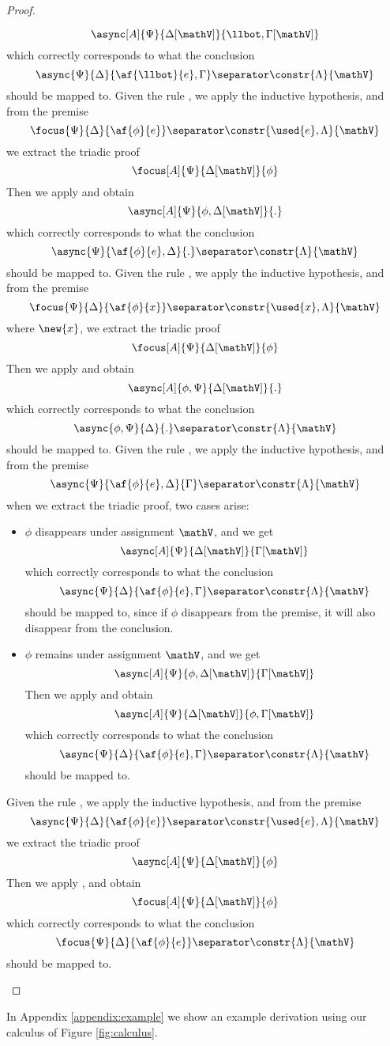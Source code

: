 \begin{proof}
\begin{itemize}
			$$ \async[A]{\Psi}{\Delta[\mathV]}{\llbot, \Gamma[\mathV]} $$
			which correctly corresponds to what the conclusion
			$$ \async{\Psi}{\Delta}{\af{\llbot}{e}, \Gamma} \separator \constr{\Lambda}{\mathV} $$
			should be mapped to.
		\indCase{\displaydecide[1]} Given the rule \derRule{\displaydecide[1]}, we apply the inductive hypothesis, and from the premise
			$$ \focus{\Psi}{\Delta}{\af{\phi}{e}} \separator \constr{\used{e}, \Lambda}{\mathV} $$
			we extract the triadic proof
			$$ \focus[A]{\Psi}{\Delta[\mathV]}{\phi} $$
			Then we apply \derRule[A]{\displaydecide[1]} and obtain
			$$ \async[A]{\Psi}{\phi, \Delta[\mathV]}{.} $$
			which correctly corresponds to what the conclusion
			$$ \async{\Psi}{\af{\phi}{e}, \Delta}{.} \separator \constr{\Lambda}{\mathV} $$
			should be mapped to.
		\indCase{\displaydecide[2]} Given the rule \derRule{\displaydecide[2]}, we apply the inductive hypothesis, and from the premise
			$$ \focus{\Psi}{\Delta}{\af{\phi}{x}} \separator \constr{\used{x}, \Lambda}{\mathV} $$
			where $\new{x}$, we extract the triadic proof
			$$ \focus[A]{\Psi}{\Delta[\mathV]}{\phi} $$
			Then we apply \derRule[A]{\displaydecide[2]} and obtain
			$$ \async[A]{\phi, \Psi}{ \Delta[\mathV]}{.} $$
			which correctly corresponds to what the conclusion
			$$ \async{\phi, \Psi}{\Delta}{.} \separator \constr{\Lambda}{\mathV} $$
			should be mapped to.
		\indCase{\displaytodelta} Given the rule \derRule{\displaytodelta}, we apply the inductive hypothesis, and from the premise
			$$ \async{\Psi}{\af{\phi}{e}, \Delta}{\Gamma} \separator \constr{\Lambda}{\mathV} $$
			when we extract the triadic proof, two cases arise:
			\begin{itemize}
				\item $\phi$ disappears under assignment $\mathV$, and we get
					$$ \async[A]{\Psi}{\Delta[\mathV]}{\Gamma[\mathV]} $$
					which correctly corresponds to what the conclusion
					$$ \async{\Psi}{\Delta}{\af{\phi}{e}, \Gamma} \separator \constr{\Lambda}{\mathV} $$
					should be mapped to, since if $\phi$ disappears from the premise, it will also disappear from the conclusion.
				\item $\phi$ remains under assignment $\mathV$, and we get
					$$ \async[A]{\Psi}{\phi, \Delta[\mathV]}{\Gamma[\mathV]} $$
					Then we apply \derRule[A]{\displaytodelta} and obtain
					$$ \async[A]{\Psi}{\Delta[\mathV]}{\phi, \Gamma[\mathV]} $$
					which correctly corresponds to what the conclusion
					$$ \async{\Psi}{\Delta}{\af{\phi}{e}, \Gamma} \separator \constr{\Lambda}{\mathV} $$
					should be mapped to.
			\end{itemize}
		\indCase{\displaytoasy} Given the rule \derRule{\displaytoasy}, we apply the inductive hypothesis, and from the premise
			$$ \async{\Psi}{\Delta}{\af{\phi}{e}} \separator \constr{\used{e}, \Lambda}{\mathV} $$
			we extract the triadic proof
			$$ \async[A]{\Psi}{\Delta[\mathV]}{\phi} $$
			Then we apply \derRule[A]{\displaytoasy}, and obtain
			$$ \focus[A]{\Psi}{\Delta[\mathV]}{\phi} $$
			which correctly corresponds to what the conclusion 
			$$ \focus{\Psi}{\Delta}{\af{\phi}{e}} \separator \constr{\Lambda}{\mathV} $$
			should be mapped to.
	\end{itemize}
\end{proof}
In Appendix \ref{appendix:example} we show an example derivation using our calculus of Figure \ref{fig:calculus}.


